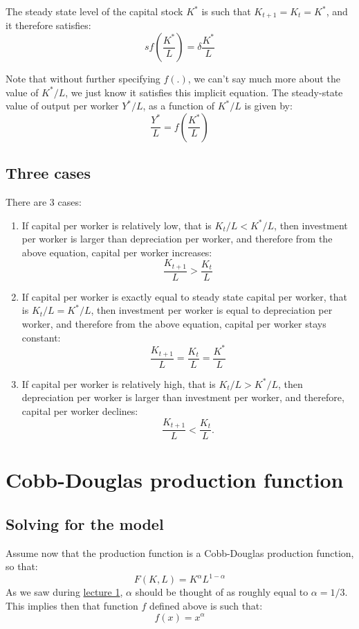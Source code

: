 \documentclass[]{book}
\theoremstyle{definition}
\theoremstyle{definition}
\theoremstyle{definition}
\theoremstyle{remark}
\begin{document}
The steady state level of the capital stock \(K^{*}\) is such that
\(K_{t+1}=K_{t}=K^{*}\), and it therefore satisfies:
\[\boxed{sf\left(\frac{K^{*}}{L}\right)=\delta\frac{K^{*}}{L}}\]

Note that without further specifying \(f(.)\), we can't say much more
about the value of \(K^{*}/L\), we just know it satisfies this implicit
equation. The steady-state value of output per worker \(Y^{*}/L\), as a
function of \(K^{*}/L\) is given by:
\[\frac{Y^{*}}{L}=f\left(\frac{K^{*}}{L}\right)\]

\subsection{Three cases}\label{three-cases}

There are 3 cases:

\begin{enumerate}
\def\labelenumi{\arabic{enumi}.}
\item
  If capital per worker is relatively low, that is \(K_{t}/L<K^{*}/L\),
  then investment per worker is larger than depreciation per worker, and
  therefore from the above equation, capital per worker increases:
  \[\frac{K_{t+1}}{L}>\frac{K_{t}}{L}\]
\item
  If capital per worker is exactly equal to steady state capital per
  worker, that is \(K_{t}/L=K^{*}/L\), then investment per worker is
  equal to depreciation per worker, and therefore from the above
  equation, capital per worker stays constant:
  \[\frac{K_{t+1}}{L}=\frac{K_{t}}{L}=\frac{K^{*}}{L}\]
\item
  If capital per worker is relatively high, that is \(K_{t}/L>K^{*}/L\),
  then depreciation per worker is larger than investment per worker, and
  therefore, capital per worker declines:
  \[\frac{K_{t+1}}{L}<\frac{K_{t}}{L}.\]
\end{enumerate}

\hypertarget{cobb}{\section{Cobb-Douglas production
function}\label{cobb}}

\subsection{Solving for the model}\label{solving-for-the-model}

Assume now that the production function is a Cobb-Douglas production
function, so that:\\
\[F(K,L)=K^{\alpha}L^{1-\alpha}\] As we saw during
\href{lecture1.html}{lecture 1}, \(\alpha\) should be thought of as
roughly equal to \(\alpha = 1/3\). This implies then that function \(f\)
defined above is such that: \[f(x)=x^{\alpha}\]
\end{document}
